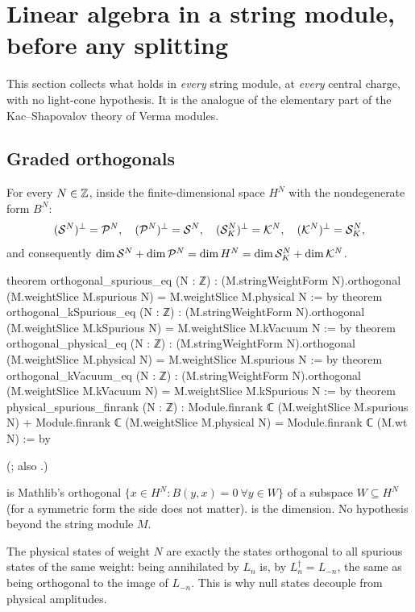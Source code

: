 \section{Linear algebra in a string module, before any splitting}\label{ch18:sec:linalg}

This section collects what holds in \emph{every} string module, at \emph{every} central charge, with no
light-cone hypothesis.  It is the analogue of the elementary part of the Kac--Shapovalov theory of
Verma modules.

\subsection{Graded orthogonals}

\begin{theorem}\label{ch18:thm:orthogonals}
For every $N\in{\mathbb{Z}}$, inside the finite-dimensional space $H^N$ with the nondegenerate form $B^N$:
\begin{equation*}
  (\mathcal{S}^N)^{\perp}=\mathcal{P}^N,\quad (\mathcal{P}^N)^{\perp}=\mathcal{S}^N,\quad
  (\mathcal{S}_K^N)^{\perp}=\mathcal{K}^N,\quad (\mathcal{K}^N)^{\perp}=\mathcal{S}_K^N,
\end{equation*}
and consequently $\dim\mathcal{S}^N+\dim\mathcal{P}^N=\dim H^N=\dim\mathcal{S}_K^N+\dim\mathcal{K}^N$.
\end{theorem}
\begin{leancode}
theorem orthogonal_spurious_eq (N : ℤ) :
    (M.stringWeightForm N).orthogonal (M.weightSlice M.spurious N) =
      M.weightSlice M.physical N := by
theorem orthogonal_kSpurious_eq (N : ℤ) :
    (M.stringWeightForm N).orthogonal (M.weightSlice M.kSpurious N) =
      M.weightSlice M.kVacuum N := by
theorem orthogonal_physical_eq (N : ℤ) :
    (M.stringWeightForm N).orthogonal (M.weightSlice M.physical N) =
      M.weightSlice M.spurious N := by
theorem orthogonal_kVacuum_eq (N : ℤ) :
    (M.stringWeightForm N).orthogonal (M.weightSlice M.kVacuum N) =
      M.weightSlice M.kSpurious N := by
theorem physical_spurious_finrank (N : ℤ) :
    Module.finrank ℂ (M.weightSlice M.spurious N) +
      Module.finrank ℂ (M.weightSlice M.physical N) = Module.finrank ℂ (M.wt N) := by
\end{leancode}
(; also .)

\begin{dictionary}
 is Mathlib's orthogonal $\{x\in H^N: B(y,x)=0\ \forall
y\in W\}$ of a subspace $W\subseteq H^N$ (for a symmetric form the side does not matter).
 is the dimension.  No hypothesis beyond the string module $M$.
\end{dictionary}
\begin{physics}
The physical states of weight $N$ are exactly the states orthogonal to all spurious states of the same
weight: being annihilated by $L_n$ is, by $L_n^\dagger=L_{-n}$, the same as being orthogonal to the image of
$L_{-n}$.  This is why null states decouple from physical amplitudes.
\end{physics}

